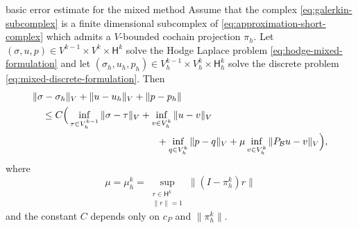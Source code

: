 \begin{Theorem}{{basic error estimate for the mixed method}}\label{thm:mixed-basic-error}
{Assume that the complex \eqref{eq:galerkin-subcomplex} is a finite dimensional subcomplex of \eqref{eq:approximation-short-complex} which admits a $V$-bounded cochain projection $\pi_h$. Let $(\sigma,u,p)\in V^{k-1}\times V^k\times\mathsf H^k$ solve the Hodge Laplace problem \eqref{eq:hodge-mixed-formulation} and let $(\sigma_h,u_h,p_h)\in V_h^{k-1}\times V_h^k\times\mathsf H_h^k$ solve the discrete problem \eqref{eq:mixed-discrete-formulation}. Then}
\[
\begin{aligned}
&\|\sigma-\sigma_h\|_V+\|u-u_h\|_V+\|p-p_h\|\\
&\quad\leq C\Big(\inf_{\tau\in V_h^{k-1}}\|\sigma-\tau\|_V+\inf_{v\in V_h^k}\|u-v\|_V\\
&\hspace{45mm}+\inf_{q\in V_h^k}\|p-q\|_V+\mu\inf_{v\in V_h^k}\|P_{\mathcal B}u-v\|_V\Big),
\end{aligned}
\]
{where}
\[
\mu=\mu_h^k=\sup_{\substack{r\in\mathsf H^k\\\|r\|=1}}\|(I-\pi_h^k)r\|
\]
{and the constant $C$ depends only on $c_P$ and $\|\pi_h^k\|$.}
\end{Theorem}

